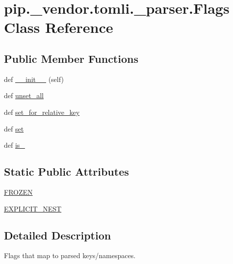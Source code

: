 \hypertarget{classpip_1_1__vendor_1_1tomli_1_1__parser_1_1Flags}{}\section{pip.\+\_\+vendor.\+tomli.\+\_\+parser.\+Flags Class Reference}
\label{classpip_1_1__vendor_1_1tomli_1_1__parser_1_1Flags}
\subsection*{Public Member Functions}
\begin{DoxyCompactItemize}
\item 
def \hyperlink{classpip_1_1__vendor_1_1tomli_1_1__parser_1_1Flags_adbd6cd4858fc5ffb541cf0385e8d6ef0}{\+\_\+\+\_\+init\+\_\+\+\_\+} (self)
\item 
def \hyperlink{classpip_1_1__vendor_1_1tomli_1_1__parser_1_1Flags_afb298c481a18995644fd94dba01285b2}{unset\+\_\+all}
\item 
def \hyperlink{classpip_1_1__vendor_1_1tomli_1_1__parser_1_1Flags_a0f552a5e8df6b75c1f45f0fbcc1f625c}{set\+\_\+for\+\_\+relative\+\_\+key}
\item 
def \hyperlink{classpip_1_1__vendor_1_1tomli_1_1__parser_1_1Flags_a1a88310e7a4d03e693135b8d4f2afee7}{set}
\item 
def \hyperlink{classpip_1_1__vendor_1_1tomli_1_1__parser_1_1Flags_ad976570a5e6f005c1f878ce223247c9e}{is\+\_\+}
\end{DoxyCompactItemize}
\subsection*{Static Public Attributes}
\begin{DoxyCompactItemize}
\item 
\hyperlink{classpip_1_1__vendor_1_1tomli_1_1__parser_1_1Flags_ad0c5025ea5fc12ac6abccde479897187}{F\+R\+O\+Z\+EN}
\item 
\hyperlink{classpip_1_1__vendor_1_1tomli_1_1__parser_1_1Flags_a11b2f8b530ce64156290d758e4095832}{E\+X\+P\+L\+I\+C\+I\+T\+\_\+\+N\+E\+ST}
\end{DoxyCompactItemize}


\subsection{Detailed Description}
\begin{DoxyVerb}Flags that map to parsed keys/namespaces.\end{DoxyVerb}
 


